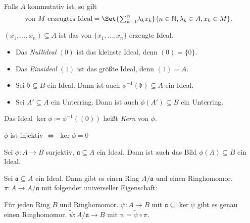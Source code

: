 \documentclass{cheat-sheet}
\newcommand{\aaa}{\mathfrak{a}}
\newcommand{\bbb}{\mathfrak{b}}
\begin{document}
\begin{bem}
  Falls $A$ kommutativ ist, so gilt
  \[
    \text{von $M$ erzeugtes Ideal} = \Set{{\sum}_{k=1}^n \lambda_k x_k}{n \in \N, \lambda_k \in A, x_k \in M}.
  \]
\end{bem}

\begin{nota}
  $(x_1, \ldots, x_n) \subseteq A$ ist das von $\{ x_1, \ldots, x_n \}$ erzeugte Ideal.
\end{nota}

\begin{bem}
  \begin{minipage}[t]{0.85 \linewidth}
    \begin{itemize}
      \item Das \emph{Nullideal} $(0)$ ist das kleinste Ideal, denn $(0) = \{ 0 \}$.
      \item Das \emph{Einsideal} $(1)$ ist das größte Ideal, denn $(1) = A$.
    \end{itemize}
  \end{minipage}
\end{bem}


\begin{prop}
  \begin{itemize}
    \item Sei $\bbb \subseteq B$ ein Ideal.
    Dann ist auch $\phi^{-1}(\bbb) \subseteq A$ ein Ideal.
    \item Sei $A' \subseteq A$ ein Unterring.
    Dann ist auch $\phi(A') \subseteq B$ ein Unterring.
  \end{itemize}
\end{prop}

\begin{defn}
  Das Ideal $\ker \phi \coloneqq \phi^{-1}((0))$ heißt \emph{Kern} von $\phi$.
\end{defn}

\begin{bem}
  $\phi$ ist injektiv $\iff$ $\ker \phi = 0$
\end{bem}

\begin{prop}
  Sei $\phi : A \to B$ surjektiv, $\aaa \subseteq A$ ein Ideal.
  Dann ist auch das Bild $\phi(A) \subseteq B$ ein Ideal.
\end{prop}


\begin{prop}
  Sei $\aaa \subseteq A$ ein Ideal.
  Dann gibt es einen Ring $A/\aaa$ und einen Ringhomomor. $\pi : A \to A/\aaa$ mit folgender universeller Eigenschaft:

  \hfill\begin{minipage}{0.95 \linewidth}
    Für jeden Ring $B$ und Ringhomomor. $\psi : A \to B$ mit $\aaa \subseteq \ker \psi$ gibt es genau einen Ringhomomor. $\widetilde{\psi} : A/\aaa \to B$ mit $\psi = \widetilde{\psi} \circ \pi$.
  \end{minipage}
\end{prop}
\end{document}
